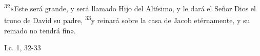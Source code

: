 \documentclass[../../rosario.tex]{subfiles}
\begin{document}
    \textsuperscript{32}«Este será grande, y será llamado Hijo del Altísimo, y le dará el Señor Dios el trono de David su padre, \textsuperscript{33}y reinará
    sobre la casa de Jacob etérnamente, y su reinado no tendrá fin».
    \begin{flushright}
    Lc. 1, 32-33
    \end{flushright}
\end{document}
